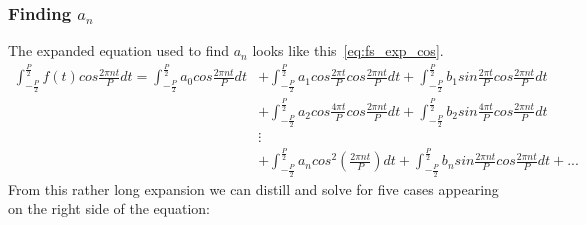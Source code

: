 \documentclass[titlepage]{article}
\begin{document}
\subsubsection{Finding $a_n$}

    The expanded equation used to find $a_n$ looks like this~\eqref{eq:fs_exp_cos}.
    \begin{equation}\label{eq:fs_exp_cos}
    \begin{split}
        \int_{-\frac{P}{2}}^{\frac{P}{2}}f(t)cos\frac{2\pi nt}{P}dt 
        = \int_{-\frac{P}{2}}^{\frac{P}{2}}a_0cos\frac{2\pi nt}{P}dt 
        & +\int_{-\frac{P}{2}}^{\frac{P}{2}}a_1cos\frac{2\pi t}{P}cos\frac{2\pi nt}{P}dt +
        \int_{-\frac{P}{2}}^{\frac{P}{2}}b_1sin\frac{2\pi t}{P}cos\frac{2\pi nt}{P}dt \\
        & + \int_{-\frac{P}{2}}^{\frac{P}{2}}a_2cos\frac{4\pi t}{P}cos\frac{2\pi nt}{P}dt +
        \int_{-\frac{P}{2}}^{\frac{P}{2}}b_2sin\frac{4\pi t}{P}cos\frac{2\pi nt}{P}dt \\
        & \vdots \\
        & + \int_{-\frac{P}{2}}^{\frac{P}{2}}a_ncos^2(\frac{2\pi nt}{P})dt +
        \int_{-\frac{P}{2}}^{\frac{P}{2}}b_nsin\frac{2\pi nt}{P}cos\frac{2\pi nt}{P}dt 
        + ...
    \end{split}
    \end{equation}
    From this rather long expansion we can distill and solve for five cases appearing
    on the right side of the equation:
\end{document}
